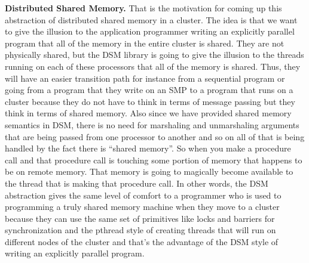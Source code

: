 \documentclass[11pt]{lecture}
\begin{document}
\noindent
{\bf Distributed Shared Memory.} That is the motivation for coming up this abstraction of distributed shared memory 
in a cluster. The idea is that we want to give the illusion to the application programmer writing an explicitly 
parallel program that all of the memory in the entire cluster is shared. They are not physically shared, but the DSM library is going to give the illusion to the threads running on each of these processors that all of the memory 
is shared. Thus, they will have an easier transition path for instance from 
a sequential program or going from a program that they write on an SMP to 
a program that runs on a cluster because they do not have to think in terms of 
message passing but they think in terms of shared memory. Also since 
we have provided shared memory semantics in DSM, there is no need for 
marshaling and unmarshaling arguments that are being passed from one 
processor to another and so on all of that is being handled by the fact 
there is ``shared memory''. So when you make a procedure call and that 
 procedure call is touching some portion of memory that happens to be on 
 remote memory. That memory is going to magically become available 
 to the thread that is making that procedure call. In other words, 
 the DSM abstraction gives the same level of comfort to a programmer who is 
 used to programming a truly shared memory machine when they move to a cluster 
 because they can use the same set of primitives like locks and barriers for synchronization and the {\code pthread} style of creating threads that 
 will run on different nodes of the cluster and that's the advantage of the 
 DSM style of writing an explicitly parallel program. 
\end{document}
